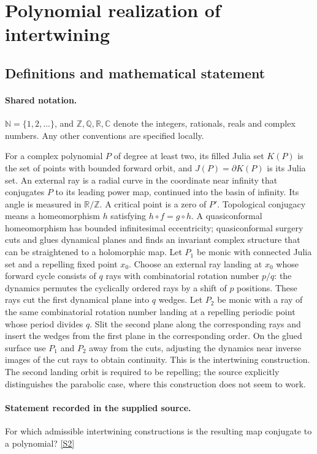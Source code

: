 \documentclass[11pt]{article}
\newcommand{\sref}[2]{\hyperlink{source:#1:#2}{[S#2]}}
\begin{document}
\section{Polynomial realization of intertwining}\label{statement}

\subsection{Definitions and mathematical statement}

\paragraph{Shared notation.}$\mathbb N=\{1,2,\ldots\}$, and $\mathbb Z,\mathbb Q,\mathbb R,\mathbb C$ denote the integers, rationals, reals and complex numbers. Any other conventions are specified locally.


For a complex polynomial $P$ of degree at least two, its filled Julia set $K(P)$ is the set of points with bounded forward orbit, and $J(P)=\partial K(P)$ is its Julia set. An external ray is a radial curve in the coordinate near infinity that conjugates $P$ to its leading power map, continued into the basin of infinity. Its angle is measured in $\mathbb R/\mathbb Z$. A critical point is a zero of $P'$. Topological conjugacy means a homeomorphism $h$ satisfying $h\circ f=g\circ h$. A quasiconformal homeomorphism has bounded infinitesimal eccentricity; quasiconformal surgery cuts and glues dynamical planes and finds an invariant complex structure that can be straightened to a holomorphic map.
Let $P_1$ be monic with connected Julia set and a repelling fixed point $x_0$. Choose an external ray landing at $x_0$ whose forward cycle consists of $q$ rays with combinatorial rotation number $p/q$: the dynamics permutes the cyclically ordered rays by a shift of $p$ positions. These rays cut the first dynamical plane into $q$ wedges. Let $P_2$ be monic with a ray of the same combinatorial rotation number landing at a repelling periodic point whose period divides $q$. Slit the second plane along the corresponding rays and insert the wedges from the first plane in the corresponding order. On the glued surface use $P_1$ and $P_2$ away from the cuts, adjusting the dynamics near inverse images of the cut rays to obtain continuity. This is the intertwining construction. The second landing orbit is required to be repelling; the source explicitly distinguishes the parabolic case, where this construction does not seem to work.
\paragraph{Statement recorded in the supplied source.}
For which admissible intertwining constructions is the resulting map conjugate to a polynomial? \sref{statement}{2}
\end{document}
